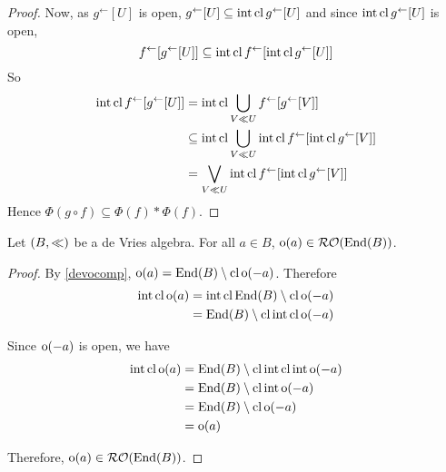 \begin{proof}
	Now, as \( g^\leftarrow[U] \) is open, \( g^\leftarrow[U] \subseteq \int\cl{g^\leftarrow[U]} \) and since \( \int\cl{g^\leftarrow[U]} \) is open,
	\[ f^\leftarrow[g^\leftarrow[U]] \subseteq \int\cl{f^\leftarrow[\int\cl{g^\leftarrow[U]}]} \]
	So
	\begin{align*}
		\int\cl{f^\leftarrow[g^\leftarrow[U]]} &= \int\cl{\bigcup_{V \ll U} f^\leftarrow[g^\leftarrow[V]]} \\
		&\subseteq \int\cl{\bigcup_{V \ll U} \int\cl{f^\leftarrow[\int\cl{g^\leftarrow[V]}]}} \\
		&= \bigvee_{V \ll U} \int\cl{f^\leftarrow[\int\cl{g^\leftarrow[V]}]}
	\end{align*}
	Hence \( \Phi(g \circ f) \subseteq \Phi(f) \ast \Phi(f) \).
	
\end{proof}


\begin{theorem}
	\label{contain1}
	Let \( (B,\dev) \) be a de Vries algebra.  For all \( a \in B \), \( \o(a) \in \RO(\End(B)) \).
\end{theorem}
\begin{proof}
	By \ref{devocomp}, \( \o(a) = \End(B) \setminus \cl{\o(-a)} \).  Therefore
	\begin{align*}
		\int\cl{\o(a)} &= \int\cl{\End(B) \setminus \cl{\o(-a)}} \\
		&= \End(B) \setminus \cl\int\cl{\o(-a)}
	\end{align*}
	
	Since \( \o(-a) \) is open, we have
	\begin{align*}
		\int\cl{\o(a)} &= \End(B) \setminus \cl\int\cl\int{\o(-a)} \\
		&= \End(B) \setminus \cl\int{\o(-a)} \\
		&= \End(B) \setminus \cl{\o(-a)} \\
		&= \o(a)
	\end{align*}

	Therefore, \( \o(a) \in \RO(\End(B)) \).
\end{proof}

